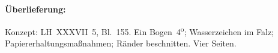 %  
%				
%
%
%
%
%
%
\frenchspacing
%
\begin{ledgroupsized}[r]{120mm}
\footnotesize
\pstart
\noindent\textbf{Überlieferung:}
\pend
\end{ledgroupsized}
%
\begin{ledgroupsized}[r]{114mm}
\footnotesize
\pstart \parindent -6mm
%
Konzept:
LH~XXXVII~5, Bl.~155. 
Ein Bogen~4\textsuperscript{o};
Wasserzeichen im Falz;
Papiererhaltungsmaßnahmen;
Ränder beschnitten.
Vier Seiten.
\pend
\end{ledgroupsized}
%
%
\vspace{5mm}
